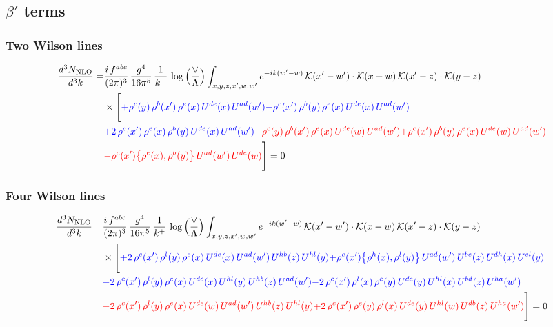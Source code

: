 \documentclass[9pt]{article}
\numberwithin{equation}{section}
\begin{document}
\subsection{$\beta'$ terms}
\subsubsection{Two Wilson lines}
\begin{align}
    \frac{d^{3}N_{\rm NLO}}{d^{3}k}= & \frac{i\,f^{abc}}{(2\pi)^{3}}\,\frac{g^{4}}{16\pi^{5}}\,\frac{1}{k^{+}}\,\log\Big(\frac{\vee}{\Lambda}\Big)\int_{x,y,z,x',w,w'}e^{-ik(w'-w)}\,\mathcal{K}(x'-w')\cdot\mathcal{K}(x-w)\,\mathcal{K}(x'-z)\cdot\mathcal{K}(y-z)\notag \\ & \times\Bigg[{\color{blue}+\rho^{c}(y)\,\rho^{b}(x')\,\rho^{e}(x)\,U^{de}(x)\,U^{ad}(w')}{\color{blue}-\rho^{c}(x')\,\rho^{b}(y)\,\rho^{e}(x)\,U^{de}(x)\,U^{ad}(w')}\notag \\ & {\color{blue}+2\,\rho^{c}(x')\,\rho^{e}(x)\,\rho^{b}(y)\,U^{de}(x)\,U^{ad}(w')}{\color{red}-\rho^{c}(y)\,\rho^{b}(x')\,\rho^{e}(x)\,U^{de}(w)\,U^{ad}(w')}{\color{red}+\rho^{c}(x')\,\rho^{b}(y)\,\rho^{e}(x)\,U^{de}(w)\,U^{ad}(w')}\notag \\ & {\color{red} -\rho^{c}(x')\big\{\rho^{e}(x),\rho^{b}(y)\big\}\,U^{ad}(w')\,U^{de}(w)}\Bigg] = 0 
\end{align}    
\subsubsection{Four Wilson lines}
\begin{align}
    \frac{d^{3}N_{\rm NLO}}{d^{3}k}= & \frac{i\,f^{abc}}{(2\pi)^{3}}\,\frac{g^{4}}{16\pi^{5}}\,\frac{1}{k^{+}}\,\log\Big(\frac{\vee}{\Lambda}\Big)\int_{x,y,z,x',w,w'}e^{-ik(w'-w)}\,\mathcal{K}(x'-w')\cdot\mathcal{K}(x-w)\,\mathcal{K}(x'-z)\cdot\mathcal{K}(y-z)\notag \\ & \times\Bigg[{\color{blue}+2\,\rho^{c}(x')\,\rho^{l}(y)\,\rho^{e}(x)\,U^{de}(x)\,U^{ad}(w')\,U^{hb}(z)\,U^{hl}(y)}{\color{blue}+\rho^{c}(x')\big\{\rho^{h}(x),\rho^{l}(y)\big\}\,U^{ad}(w')\,U^{be}(z)\,U^{dh}(x)\,U^{el}(y)}\notag \\ & {\color{blue}-2\,\rho^{c}(x')\,\rho^{l}(y)\,\rho^{e}(x)\,U^{de}(x)\,U^{hl}(y)\,U^{hb}(z)\,U^{ad}(w')}{\color{blue}-2\,\rho^{c}(x')\,\rho^{l}(x)\,\rho^{e}(y)\,U^{de}(y)\,U^{hl}(x)\,U^{bd}(z)\,U^{ha}(w')}\notag \\ & {\color{red}-2\,\rho^{c}(x')\,\rho^{l}(y)\,\rho^{e}(x)\,U^{de}(w)\,U^{ad}(w')\,U^{hb}(z)\,U^{hl}(y)}{\color{red}+2\,\rho^{c}(x')\,\rho^{e}(y)\,\rho^{l}(x)\,U^{de}(y)\,U^{hl}(w)\,U^{db}(z)\,U^{ha}(w')}\Bigg] = 0
\end{align}
\end{document}
